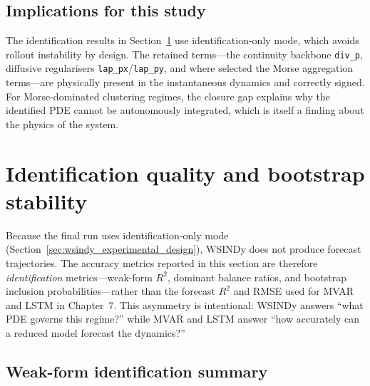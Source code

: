 \subsection{Implications for this study}

The identification results in Section~\ref{sec:identification_quality} use
identification-only mode, which avoids rollout instability by design.
The retained terms---the continuity backbone \texttt{div\_p}, diffusive
regularisers \texttt{lap\_px}/\texttt{lap\_py}, and where selected the Morse
aggregation terms---are physically present in the instantaneous dynamics and
correctly signed.  For Morse-dominated clustering regimes, the closure gap
explains why the identified PDE cannot be autonomously integrated, which is
itself a finding about the physics of the system.

\section{Identification quality and bootstrap stability}
\label{sec:identification_quality}

Because the final run uses identification-only mode
(Section~\ref{sec:wsindy_experimental_design}), WSINDy does not produce
forecast trajectories.  The accuracy metrics reported in this section are
therefore \emph{identification} metrics---weak-form $R^2$, dominant balance
ratios, and bootstrap inclusion probabilities---rather than the forecast $R^2$
and RMSE used for MVAR and LSTM in Chapter~7.  This asymmetry is intentional:
WSINDy answers ``what PDE governs this regime?'' while MVAR and LSTM answer
``how accurately can a reduced model forecast the dynamics?''

\subsection{Weak-form identification summary}

